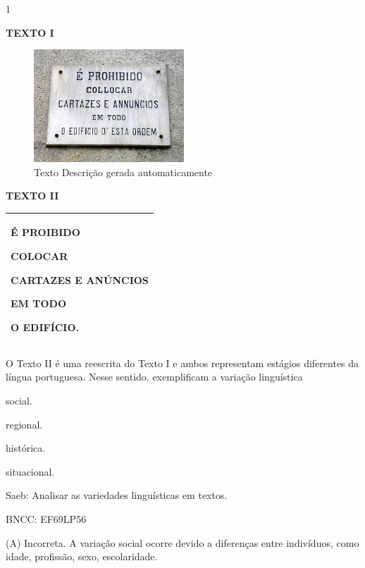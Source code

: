 \num{1}

\textbf{TEXTO I}

\begin{figure}
\centering
\includegraphics[width=2.21875in,height=1.66591in]{./imgSAEB_8_POR/media/image37.jpeg}
\caption{Texto Descrição gerada automaticamente}
\end{figure}


\textbf{TEXTO II}

\begin{longtable}[]{@{}l@{}}
\toprule
\endhead
\begin{minipage}[t]{0.30\columnwidth}\raggedright
É PROIBIDO

COLOCAR

CARTAZES E ANÚNCIOS

EM TODO

O EDIFÍCIO.\strut
\end{minipage}\tabularnewline
\bottomrule
\end{longtable}


O Texto II é uma reescrita do Texto I e ambos representam estágios
diferentes da língua portuguesa. Nesse sentido, exemplificam a variação
linguística

\begin{escolha}
\item
  social.
\item
  regional.
\item
  histórica.
\item
  situacional.
\end{escolha}

Saeb: Analisar as variedades linguísticas em textos.

BNCC: EF69LP56

(A) Incorreta. A variação social ocorre devido a diferenças entre
indivíduos, como idade, profissão, sexo, escolaridade.

